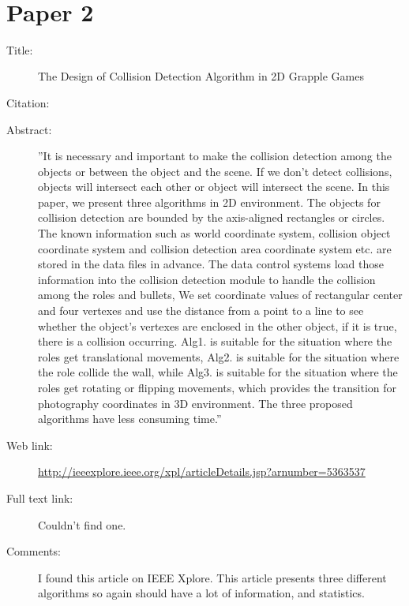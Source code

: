 \documentclass{scrartcl}
\begin{document}
\
\section*{Paper 2}
\begin{description}
	\item[Title:] The Design of Collision Detection Algorithm in 2D Grapple Games
	\item[Citation:] \cite{Tan}
	\item[Abstract:] ''It is necessary and important to make the collision detection among the objects or between the object and the scene. If we don't detect collisions, objects will intersect each other or object will intersect the scene. In this paper, we present three algorithms in 2D environment. The objects for collision detection are bounded by the axis-aligned rectangles or circles. The known information such as world coordinate system, collision object coordinate system and collision detection area coordinate system etc. are stored in the data files in advance. The data control systems load those information into the collision detection module to handle the collision among the roles and bullets, We set coordinate values of rectangular center and four vertexes and use the distance from a point to a line to see whether the object's vertexes are enclosed in the other object, if it is true, there is a collision occurring. Alg1. is suitable for the situation where the roles get translational movements, Alg2. is suitable for the situation where the role collide the wall, while Alg3. is suitable for the situation where the roles get rotating or flipping movements, which provides the transition for photography coordinates in 3D environment. The three proposed algorithms have less consuming time.''
	\item[Web link:] \url{http://ieeexplore.ieee.org/xpl/articleDetails.jsp?arnumber=5363537}
	\item[Full text link:] Couldn't find one. 
	\item[Comments:] I found this article on IEEE Xplore. This article presents three different algorithms so again should have a lot of information, and statistics. 
\end{description}
\end{document}
